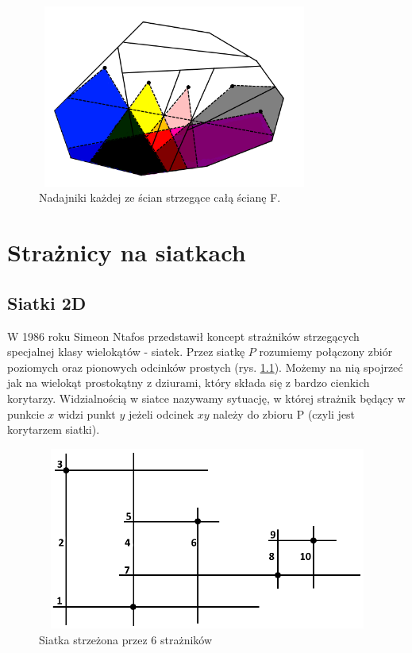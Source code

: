\documentclass[brudnopis]{xmgr}
\theoremstyle{definition}
\begin{document}
\begin{figure}[ht!]
  \centering
  \label{pokrycie f}
  \includegraphics[width=9cm,height=6cm]{rysunki/pokrycie_f.png}
  \caption{Nadajniki każdej ze ścian strzegące całą ścianę F.}
  \vspace{6in}
\end{figure} 

\chapter{Strażnicy na siatkach}
\section{Siatki 2D}
W 1986 roku Simeon Ntafos przedstawił koncept strażników strzegących specjalnej klasy wielokątów - siatek.
Przez siatkę $P$ rozumiemy połączony zbiór poziomych oraz pionowych odcinków prostych (rys. \ref{fig:siatka 2d}). Możemy na nią spojrzeć jak na wielokąt prostokątny z dziurami, który składa się z bardzo cienkich korytarzy.
Widzialnością w siatce nazywamy sytuację, w której strażnik będący w punkcie $x$ widzi punkt $y$ jeżeli odcinek $xy$ należy do zbioru P (czyli jest korytarzem siatki).
 \begin{figure}[ht!]
   \centering
   \includegraphics[width=14cm,height=6cm]{rysunki/przykladowa_siatka.png}
   \caption{Siatka strzeżona przez 6 strażników}
   \label{fig:siatka 2d}
 \end{figure} 
\end{document}

